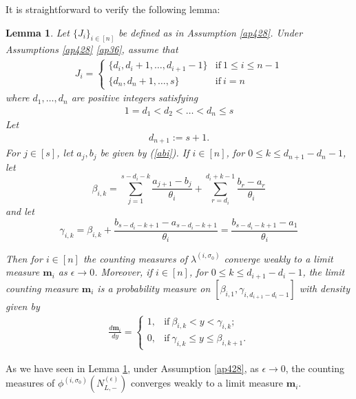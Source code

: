\documentclass[11pt]{amsart}
\theoremstyle{plain}
\newtheorem{lemma}[theorem]{Lemma}
\theoremstyle{definition}
\theoremstyle{remark}
\newcommand\si{\sigma}
\newcommand\bm{\mathbf{m}}
\numberwithin{equation}{section}
\numberwithin{theorem}{section}
\numberwithin{figure}{section}
\begin{document}
It is straightforward to verify the following lemma:
\begin{lemma}\label{cm}Let $\{J_i\}_{i\in[n]}$ be defined as in Assumption \ref{ap428}.
Under Assumptions \ref{ap428} \ref{ap36}, assume that 
\begin{eqnarray*}
J_i=\left\{\begin{array}{cc}\{d_i,d_i+1,\ldots,d_{i+1}-1\}& \mathrm{if}\ 1\leq i\leq n-1\\ \{d_n, d_n+1,\ldots,s\}& \mathrm{if}\ i=n \end{array}\right.
\end{eqnarray*}
where $d_1,\ldots,d_n$ are positive integers satisfying
\begin{align*}
1=d_1<d_2<\ldots <d_n\leq s
\end{align*}
Let
\begin{align*}
d_{n+1}:=s+1.
\end{align*}
For $j\in[s]$, let $a_j,b_j$ be given by (\ref{abi}). 
If $i\in[n]$, for $0\leq k\leq d_{n+1}-d_n-1$, let
\begin{equation}
\beta_{i,k}
=\sum_{j=1}^{s-d_i-k}\frac{a_{j+1}-b_j}{\theta_i}
+\sum_{r=d_i}^{d_i+k-1}\frac{b_r-a_r}{\theta_i}
\label{dbik}
\end{equation}
and let
\begin{equation}
\gamma_{i,k}=\beta_{i,k}+\frac{b_{s-d_i-k+1}-a_{s-d_i-k+1}}{\theta_i}
=\frac{b_{s-d_i-k+1}-a_1}{\theta_i}\label{dcik}
\end{equation}



Then for $i\in[n]$ the counting measures of $\lambda^{(i,\si_0)}$ converge weakly to a limit measure $\bm_i$ as $\epsilon\rightarrow 0$. Moreover,
if $i\in[n]$, for $0\leq k\leq d_{i+1}-d_i-1$, the limit counting measure $\mathbf{m}_i$ is a probability measure on $[\beta_{i,1},\gamma_{i,d_{i+1}-d_i-1}]$ with density given by
\begin{eqnarray*}
\frac{d\mathbf{m}_i}{dy}=\left\{\begin{array}{cc}1,& \mathrm{if}\ \beta_{i,k}< y< \gamma_{i,k};\\0,& \mathrm{if}\ \gamma_{i,k}\leq y\leq \beta_{i,k+1}. \end{array}\right.
\end{eqnarray*}
\end{lemma}

As we have seen in Lemma \ref{cm}, under Assumption \ref{ap428}, as $\epsilon\rightarrow 0$, the counting measures of  $\phi^{(i,\si_0)}(N_{L,-}^{(\epsilon)})$ converges weakly to a limit measure $\bm_i$.
\end{document}
